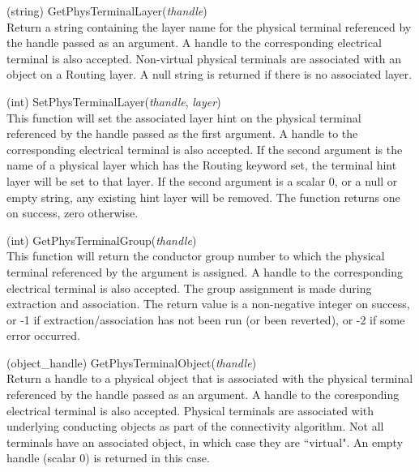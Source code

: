 \begin{description}
\item{(string) \vt GetPhysTerminalLayer({\it thandle\/})}\\
Return a string containing the layer name for the physical terminal
referenced by the handle passed as an argument.  A handle to the
corresponding electrical terminal is also accepted.  Non-virtual
physical terminals are associated with an object on a {\et Routing}
layer.  A null string is returned if there is no associated layer.

\item{(int) \vt SetPhysTerminalLayer({\it thandle\/}, {\it layer\/})}\\
This function will set the associated layer hint on the physical
terminal referenced by the handle passed as the first argument.  A
handle to the corresponding electrical terminal is also accepted.  If
the second argument is the name of a physical layer which has the {\et
Routing} keyword set, the terminal hint layer will be set to that
layer.  If the second argument is a scalar 0, or a null or empty
string, any existing hint layer will be removed.  The function returns
one on success, zero otherwise.

\item{(int) \vt GetPhysTerminalGroup({\it thandle\/})}\\
This function will return the conductor group number to which the
physical terminal referenced by the argument is assigned.  A handle to
the corresponding electrical terminal is also accepted.  The group
assignment is made during extraction and association.  The return
value is a non-negative integer on success, or -1 if
extraction/association has not been run (or been reverted), or -2 if
some error occurred.

\item{(object\_handle) \vt GetPhysTerminalObject({\it thandle\/})}\\
Return a handle to a physical object that is associated with the
physical terminal referenced by the handle passed as an argument.  A
handle to the coresponding electrical terminal is also accepted. 
Physical terminals are associated with underlying conducting objects
as part of the connectivity algorithm.  Not all terminals have an
associated object, in which case they are ``virtual".  An empty handle
(scalar 0) is returned in this case.
\end{description}


